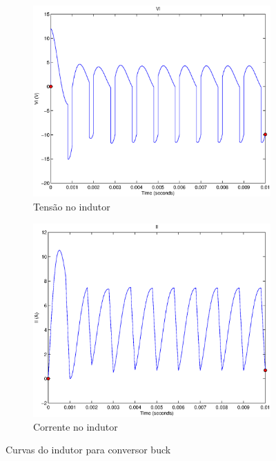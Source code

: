 \documentclass{article}
\begin{document}
\begin{figure}[H]
	\centering
	\begin{subfigure}[b]{0.4\linewidth}
		\includegraphics[width=\linewidth]{matlab/buck/b_vl}
		\caption{Tensão no indutor}
	\end{subfigure}
	\begin{subfigure}[b]{0.4\linewidth}
		\centering
		\includegraphics[width=\linewidth]{matlab/buck/b_il}
		\caption{Corrente no indutor}
	\end{subfigure}
	\caption{Curvas do indutor para conversor buck}
	\label{fig:bl}
\end{figure}
\end{document}
